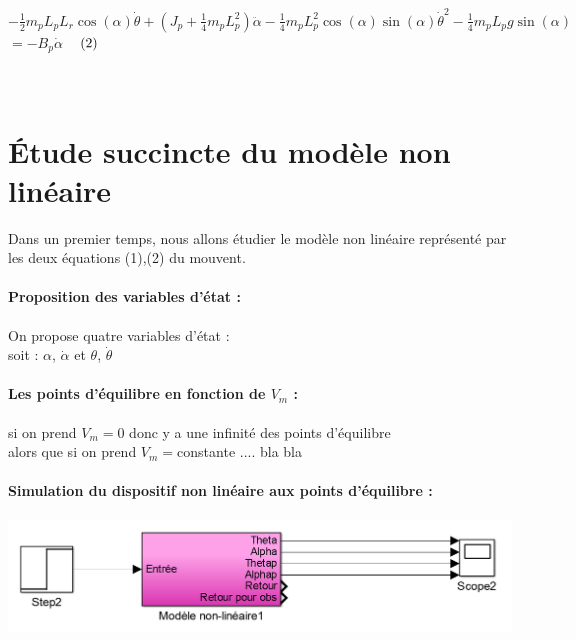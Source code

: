 \documentclass[12pt, a4paper, openany]{report}
\begin{document}
$-\frac{1}{2}m_{p}L_{p}L_{r}\cos(\alpha)\dot{\theta}+(J_{p}+\frac{1}{4}m_{p}L_{p}^{2})\ddot{\alpha}-\frac{1}{4}m_{p}L_{p}^{2}\cos(\alpha)\sin(\alpha)\dot{\theta}^{2}-\frac{1}{4}m_{p}L_{p}g\sin(\alpha)$\\$=-B_{p}\dot{\alpha}$   $\hspace{3mm}(2)$ \\\\\\
  

   


\section{Étude succincte du modèle non linéaire  }

Dans un premier temps, nous allons étudier le modèle non linéaire représenté par les deux équations (1),(2) du mouvent.

 \paragraph{Proposition des variables d'état :\\}

 On propose quatre variables d'état : \\
 soit : $\alpha$, $\dot{\alpha}$ et  $\theta$, $\dot{\theta}$\\
 
 \paragraph{Les points d'équilibre en fonction de $V_{m}$ :\\}
 
 si on prend  $V_{m}=0$ donc y a une infinité des points d'équilibre \\
 alors que si on prend $V_{m}=$constante   .... bla bla \\
 
  \paragraph{Simulation du dispositif non linéaire aux points d'équilibre :\\}
 
  
\begin{center}
\includegraphics[scale=0.5]{modelenonlineairesimulink.png}
\label{fig1} 
\end{center} 
 
\end{document}

